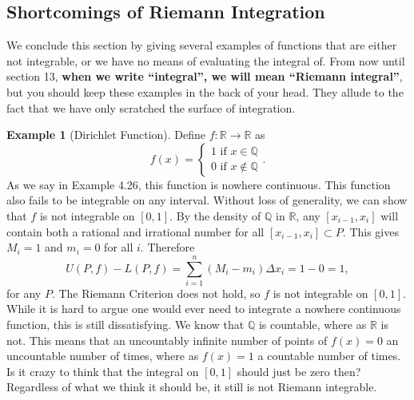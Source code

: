 \documentclass{article}
\newcommand{\R}{\mathbb{R}}
\newcommand{\Q}{\mathbb{Q}}
\theoremstyle{definition}
\newtheorem{example}{Example}[section]
\begin{document}
\subsection{Shortcomings of Riemann Integration}
We conclude this section by giving several examples of functions that are either not integrable, or we have no means of evaluating the integral of. From now until section 13,\textbf{ when we write ``integral'', we will mean ``Riemann integral''}, but you should keep these examples in the back of your head. They allude to the fact that we have only scratched the surface of integration.
\begin{example}[Dirichlet Function]
	Define $ f:\R\to\R $ as $$f(x)=\begin{cases}
	1\text{ if }x\in\Q\\0\text{ if }x\notin\Q
	\end{cases} .$$ As we say in Example 4.26, this function is nowhere continuous. This function also fails to be integrable on any interval. Without loss of generality, we can show that $ f $ is not integrable on $ [0,1] $. By the density of $ \Q $ in $ \R $, any $ [x_{i-1},x_i] $ will contain both a rational and irrational number for all $ [x_{i-1},x_i]\subset P $. This gives $ M_i=1 $ and $ m_i=0 $ for all $ i $. Therefore $$U(P,f)-L(P,f)=\sum_{i=1}^{n}(M_i-m_i)\Delta x_i=1-0=1 ,$$ for any $ P $. The Riemann Criterion does not hold, so $ f $ is not integrable on $ [0,1] $. While it is hard to argue one would ever need to integrate a nowhere continuous function, this is still dissatisfying. We know that $ \Q $ is countable, where as $ \R $ is not. This means that an uncountably infinite number of points of $ f(x)=0 $ an uncountable number of times, where as $ f(x)=1 $ a countable number of times. Is it crazy to think that the integral on $ [0,1]$ should just be zero then? Regardless of what we think it should be, it still is not Riemann integrable.
\end{example}
\end{document}
